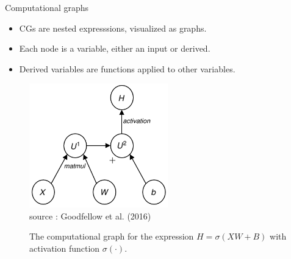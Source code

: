 \begin{vbframe}{Computational graphs}
  \begin{minipage}{0.5\textwidth}
    \begin{itemize}
      \item CGs are nested expresssions, visualized as graphs.
      \item Each node is a variable, either an input or derived.
      \item Derived variables are functions applied to other variables.
    \end{itemize}
  \end{minipage}\hfill
  \begin{minipage}{0.5\textwidth}
    \begin{figure}
      \centering
        \includegraphics[width=6cm]{figure/compgraph1.png}
        \tiny{\\source : Goodfellow et al. (2016)}
        \caption{The computational graph for the expression $H = \sigma(XW + B)$ with activation function $\sigma(\cdot)$.}
    \end{figure}
  \end{minipage}  
\end{vbframe}

